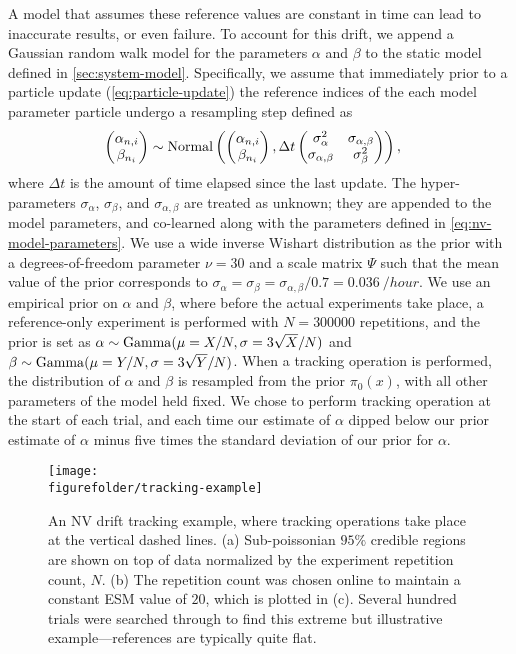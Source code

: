 \documentclass[aps,nofootinbib,twocolumn,superscriptaddress]{revtex4}
\newcommand{\figurefolder}{../fig}
\newcommand{\mps}{x}
\begin{document}
A model that assumes these reference values are constant
in time can lead to inaccurate results, or even failure.
To account for this drift,
we append a Gaussian random
walk model for the parameters $\alpha$ and $\beta$ to the static
model defined in \autoref{sec:system-model}.
Specifically, we assume that immediately prior to
a particle update (\autoref{eq:particle-update}) the reference
indices of the each model parameter particle
undergo a resampling step defined as
\begin{align}
    \begin{pmatrix}\alpha_{n,i}\\\beta_{n_i}\end{pmatrix}
        &\sim \operatorname{Normal}\left(
            \begin{pmatrix}\alpha_{n,i}\\\beta_{n_i}\end{pmatrix},
            \Delta t
            \begin{pmatrix}\sigma_\alpha^2&\sigma_{\alpha,\beta}\\\sigma_{\alpha,\beta}&\sigma_\beta^2\end{pmatrix}
            \right),
\end{align}
where $\Delta t$ is the amount of time elapsed since the last
update.
The hyper-parameters $\sigma_\alpha$, $\sigma_\beta$, and
$\sigma_{\alpha,\beta}$ are treated as unknown; they are appended to
the model parameters, and co-learned along with the parameters defined
in \autoref{eq:nv-model-parameters}.
We use a wide inverse Wishart distribution as the prior with a
degrees-of-freedom parameter $\nu=30$ and a scale matrix $\Psi$
such that the mean value of the prior corresponds to
$\sigma_\alpha=\sigma_\beta=\sigma_{\alpha,\beta}/0.7=\SI{0.036}{/hour}$.
We use an empirical prior on $\alpha$ and $\beta$, where before
the actual experiments take place, a reference-only experiment is performed
with $N=300000$ repetitions, and the prior
is set as $\alpha\sim\operatorname{Gamma}(\mu=X/N,\sigma=3\sqrt{X}/N)$
and $\beta\sim\operatorname{Gamma}(\mu=Y/N,\sigma=3\sqrt{Y}/N)$.
When a tracking operation is performed, the distribution of
$\alpha$ and $\beta$ is resampled from the prior $\pi_0(\mps)$,
with all other parameters of the model held fixed.
We chose to perform tracking operation at the start of each trial,
and each time our estimate of $\alpha$ dipped below
our prior estimate of $\alpha$ minus five times the standard
deviation of our prior for $\alpha$.


\begin{figure}
    \centering
    \texttt{[image: \\figurefolder/tracking-example]}
    \caption{An NV drift tracking example, where tracking
    operations take place at the vertical dashed lines.
    (a) Sub-poissonian $95\%$ credible regions are shown on top of data
    normalized by the experiment repetition count, $N$.
    (b) The repetition count was chosen online to maintain a
    constant ESM value of $20$, which is plotted in (c).
    Several hundred trials were searched through
    to find this extreme but illustrative example---references are typically
    quite flat.}
    \label{fig:tracking-example}
\end{figure}
\end{document}
